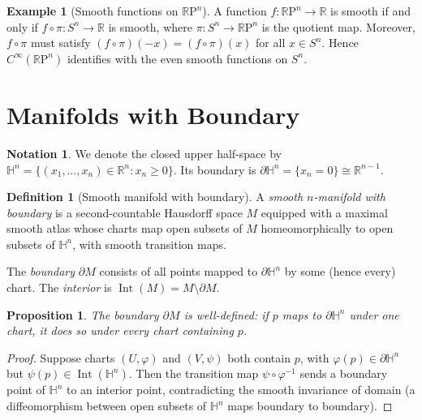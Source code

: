 \documentclass[12pt,a4paper,openany]{book}
\newtheorem{proposition}[theorem]{Proposition}
\theoremstyle{definition}
\newtheorem{definition}[theorem]{Definition}
\newtheorem{example}[theorem]{Example}
\newtheorem{notation}[theorem]{Notation}
\theoremstyle{remark}
\newcommand{\R}{\mathbb{R}}
\newcommand{\RP}{\mathbb{R}\mathrm{P}}
\begin{document}
\begin{example}[Smooth functions on $\RP^n$]\label{ex:smooth-on-RPn}
A function $f \colon \RP^n \to \R$ is smooth if and only if
$f \circ \pi \colon S^n \to \R$ is smooth, where $\pi \colon S^n \to \RP^n$
is the quotient map.  Moreover, $f \circ \pi$ must satisfy
$(f \circ \pi)(-x) = (f \circ \pi)(x)$ for all $x \in S^n$.  Hence
$C^\infty(\RP^n)$ identifies with the even smooth functions on $S^n$.
\end{example}

\section{Manifolds with Boundary}
\label{sec:manifolds-boundary}

\begin{notation}\label{not:half-space}
We denote the closed upper half-space by
$\mathbb{H}^n = \{(x_1,\ldots,x_n) \in \R^n : x_n \geq 0\}$.
Its boundary is $\partial \mathbb{H}^n = \{x_n = 0\} \cong \R^{n-1}$.
\end{notation}

\begin{definition}[Smooth manifold with boundary]\label{def:manifold-boundary}
A \emph{smooth $n$-manifold with boundary} is a second-countable Hausdorff
space $M$ equipped with a maximal smooth atlas whose charts map open subsets
of $M$ homeomorphically to open subsets of $\mathbb{H}^n$, with smooth
transition maps.

The \emph{boundary} $\partial M$ consists of all points
mapped to $\partial\mathbb{H}^n$ by some (hence every) chart.  The
\emph{interior} is $\operatorname{Int}(M) = M \setminus \partial M$.
\end{definition}

\begin{proposition}\label{prop:boundary-invariance}
The boundary $\partial M$ is well-defined: if $p$ maps to
$\partial \mathbb{H}^n$ under one chart, it does so under every chart
containing $p$.
\end{proposition}

\begin{proof}
Suppose charts $(U,\varphi)$ and $(V,\psi)$ both contain $p$, with
$\varphi(p) \in \partial \mathbb{H}^n$ but
$\psi(p) \in \operatorname{Int}(\mathbb{H}^n)$.  Then the transition map
$\psi \circ \varphi^{-1}$ sends a boundary point of $\mathbb{H}^n$ to an
interior point, contradicting the smooth invariance of domain
 (a diffeomorphism between open subsets of
$\mathbb{H}^n$ maps boundary to boundary).
\end{proof}
\end{document}
